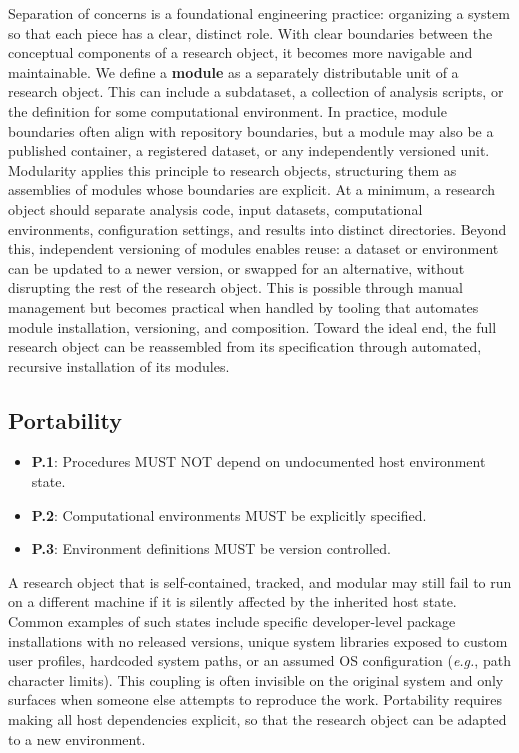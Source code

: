 \documentclass{article}
\makeatletter
\newcommand{\hyanchor}[1]{\texorpdfstring{\Hy@raisedlink{\hypertarget{#1}{}}}{}}
\newcommand{\anchoredsubsection}[2]{\subsection[#2]{\hyanchor{#1}#2}}
\makeatother
\begin{document}
Separation of concerns is a foundational engineering practice: organizing a system so that each piece has a clear, distinct role.
With clear boundaries between the conceptual components of a research object, it becomes more navigable and maintainable.
We define a \textbf{module} as a separately distributable unit of a research object.
This can include a subdataset, a collection of analysis scripts, or the definition for some computational environment.
In practice, module boundaries often align with repository boundaries, but a module may also be a published container, a registered dataset, or any independently versioned unit.
Modularity applies this principle to research objects, structuring them as assemblies of modules whose boundaries are explicit.
At a minimum, a research object should separate analysis code, input datasets, computational environments, configuration settings, and results into distinct directories.
Beyond this, independent versioning of modules enables reuse: a dataset or environment can be updated to a newer version, or swapped for an alternative, without disrupting the rest of the research object.
This is possible through manual management but becomes practical when handled by tooling that automates module installation, versioning, and composition.
Toward the ideal end, the full research object can be reassembled from its specification through automated, recursive installation of its modules.



\anchoredsubsection{portability}{Portability}

\begin{itemize}
    \item \textbf{P.1}: Procedures MUST NOT depend on undocumented host environment state.
    \item \textbf{P.2}: Computational environments MUST be explicitly specified.
    \item \textbf{P.3}: Environment definitions MUST be version controlled.
\end{itemize}

A research object that is self-contained, tracked, and modular may still fail to run on a different machine if it is silently affected by the inherited host state.
Common examples of such states include specific developer-level package installations with no released versions, unique system libraries exposed to custom user profiles, hardcoded system paths, or an assumed OS configuration (\textit{e.g.}, path character limits).
This coupling is often invisible on the original system and only surfaces when someone else attempts to reproduce the work.
Portability requires making all host dependencies explicit, so that the research object can be adapted to a new environment.
\end{document}
